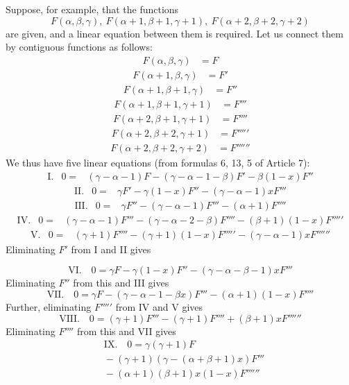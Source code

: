 Suppose, for example, that the functions
\[
F(\alpha,\beta,\gamma),\ F(\alpha+1,\beta+1,\gamma+1),\ F(\alpha+2,\beta+2,\gamma+2)
\]
are given, and a linear equation between them is required. Let us connect them by contiguous functions as follows:
\[
\begin{array}{rl}
F(\alpha,\beta,\gamma)&=F
\end{array}
\]
\[
\begin{array}{rl}
F(\alpha+1,\beta,\gamma)&=F'
\end{array}
\]
\[
\begin{array}{rl}
F(\alpha+1,\beta+1,\gamma)&=F''
\end{array}
\]
\[
\begin{array}{rl}
F(\alpha+1,\beta+1,\gamma+1)&=F'''
\end{array}
\]
\[
\begin{array}{rl}
F(\alpha+2,\beta+1,\gamma+1)&=F''''
\end{array}
\]
\[
\begin{array}{rl}
F(\alpha+2,\beta+2,\gamma+1)&=F'''''
\end{array}
\]
\[
\begin{array}{rl}
F(\alpha+2,\beta+2,\gamma+2)&=F''''''
\end{array}
\]
We thus have five linear equations (from formulas 6, 13, 5 of Article 7):
\[
\begin{array}{rcl}
\mathrm{I.}&0=&(\gamma-\alpha-1)F-(\gamma-\alpha-1-\beta)F'-\beta(1-x)F''
\end{array}
\]
\[
\begin{array}{rcl}
\mathrm{II.}&0=&\gamma F'-\gamma(1-x)F''-(\gamma-\alpha-1)xF'''
\end{array}
\]
\[
\begin{array}{rcl}
\mathrm{III.}&0=&\gamma F''-(\gamma-\alpha-1)F'''-(\alpha+1)F''''
\end{array}
\]
\[
\begin{array}{rcl}
\mathrm{IV.}&0=&(\gamma-\alpha-1)F'''-(\gamma-\alpha-2-\beta)F''''-(\beta+1)(1-x)F'''''
\end{array}
\]
\[
\begin{array}{rcl}
\mathrm{V.}&0=&(\gamma+1)F''''-(\gamma+1)(1-x)F'''''-(\gamma-\alpha-1)xF''''''
\end{array}
\]
Eliminating $F'$ from I and II gives

\[
\mathrm{VI.}\quad 0=\gamma F-\gamma(1-x)F''-(\gamma-\alpha-\beta-1)xF'''
\]
Eliminating $F''$ from this and III gives
\[
\mathrm{VII.}\quad 0=\gamma F-(\gamma-\alpha-1-\beta x)F'''-(\alpha+1)(1-x)F''''
\]
Further, eliminating $F'''''$ from IV and V gives
\[
\mathrm{VIII.}\quad 0=(\gamma+1)F'''-(\gamma+1)F''''+(\beta+1)xF''''''
\]
Eliminating $F''''$ from this and VII gives
\[
\begin{aligned}&\mathrm{IX.}\quad 0=\gamma(\gamma+1)F\\&{}-(\gamma+1)(\gamma-(\alpha+\beta+1)x)F'''\\&{}-(\alpha+1)(\beta+1)x(1-x)F''''''\end{aligned}
\]
